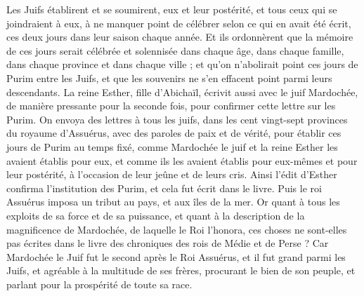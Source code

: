 \begin{multicols}{2}
Les Juifs établirent et se soumirent, eux et leur postérité, et tous ceux qui se joindraient à eux, à ne manquer point de célébrer selon ce qui en avait été écrit, ces deux jours dans leur saison chaque année.
Et ils ordonnèrent que la mémoire de ces jours serait célébrée et solennisée dans chaque âge, dans chaque famille, dans chaque province et dans chaque ville ; et qu’on n’abolirait point ces jours de Purim entre les Juifs, et que les souvenirs ne s'en effacent point parmi leurs descendants.
La reine Esther, fille d'Abichaïl, écrivit aussi avec le juif Mardochée, de manière pressante pour la seconde fois, pour confirmer cette lettre sur les Purim.
On envoya des lettres à tous les juifs, dans les cent vingt-sept provinces du royaume d'Assuérus, avec des paroles de paix et de vérité,
pour établir ces jours de Purim au temps fixé, comme Mardochée le juif et la reine Esther les avaient établis pour eux, et comme ils les avaient établis pour eux-mêmes et pour leur postérité, à l’occasion de leur jeûne et de leurs cris.
Ainsi l'édit d'Esther confirma l’institution des Purim, et cela fut écrit dans le livre.
\VerseOne{}Puis le roi Assuérus imposa un tribut au pays, et aux îles de la mer.
Or quant à tous les exploits de sa force et de sa puissance, et quant à la description de la magnificence de Mardochée, de laquelle le Roi l’honora, ces choses ne sont-elles pas écrites dans le livre des chroniques des rois de Médie et de Perse ?
Car Mardochée le Juif fut le second après le Roi Assuérus, et il fut grand parmi les Juifs, et agréable à la multitude de ses frères, procurant le bien de son peuple, et parlant pour la prospérité de toute sa race.
\PPE{}
\end{multicols}
